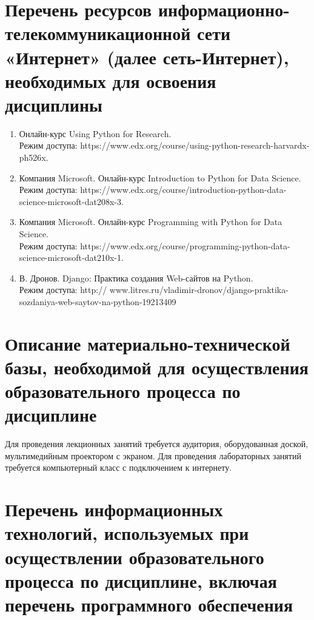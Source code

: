 \documentclass[a4paper,12pt]{article}
\begin{document}
\section{Перечень ресурсов информационно-телекоммуникационной сети «Интернет» (далее сеть-Интернет), необходимых для освоения дисциплины}
\begin{enumerate}
  
  \item Онлайн-курс Using Python for Research. \\ Режим доступа: https://www.edx.org/course/using-python-research-harvardx-ph526x. 
  
  \item Компания Microsoft. Онлайн-курс Introduction to Python for Data Science. \\ Режим доступа: https://www.edx.org/course/introduction-python-data-science-microsoft-dat208x-3. 
  
  \item Компания Microsoft. Онлайн-курс Programming with Python for Data Science. \\ Режим доступа: https://www.edx.org/course/programming-python-data-science-microsoft-dat210x-1. 
  
  \item В. Дронов. Django: Практика создания Web-сайтов на Python. \\ Режим доступа: http:// www.litres.ru/vladimir-dronov/django-praktika-sozdaniya-web-saytov-na-python-19213409 
  
\end{enumerate}


\newpage
\section{Описание материально-технической базы, необходимой для осуществления образовательного процесса по дисциплине}
  
  
       Для проведения лекционных занятий требуется аудитория, оборудованная доской,  мультимедийным проектором с экраном. 
       Для проведения лабораторных занятий требуется компьютерный класс с подключением к интернету.
  
  


\section{Перечень информационных технологий, используемых при осуществлении образовательного процесса по дисциплине, включая перечень программного обеспечения
}
\end{document}
